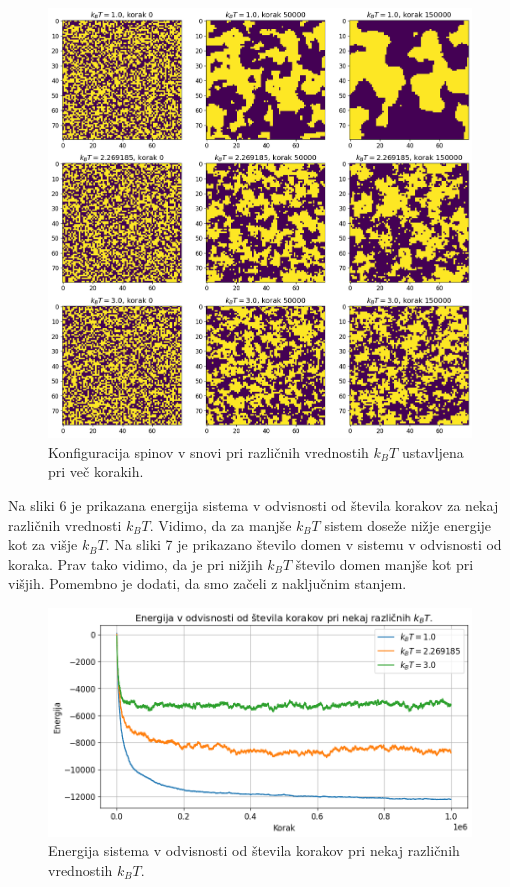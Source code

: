\documentclass[slovene,11pt,a4paper]{article}
\begin{document}
\newpage

\begin{figure}[h!]
\centering
\includegraphics[width=\linewidth]{ising1.png}
\caption{Konfiguracija spinov v snovi pri različnih vrednostih $k_BT$ ustavljena pri več korakih.}
\end{figure}

Na sliki 6 je prikazana energija sistema v odvisnosti od števila korakov za nekaj različnih vrednosti $k_BT$. Vidimo, da za manjše $k_BT$ sistem doseže nižje energije kot za višje $k_BT$. Na sliki 7 je prikazano število domen v sistemu v odvisnosti od koraka. Prav tako vidimo, da je pri nižjih $k_BT$ število domen manjše kot pri višjih. Pomembno je dodati, da smo začeli z naključnim stanjem.

\newpage

\begin{figure}[h!]
\centering
\includegraphics[width=\linewidth]{ising2.png}
\caption{Energija sistema v odvisnosti od števila korakov pri nekaj različnih vrednostih $k_BT$.}
\end{figure}
\end{document}
